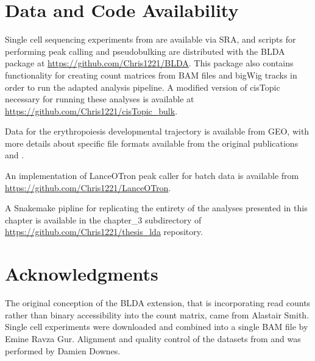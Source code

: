 \section{Data and Code Availability}

Single cell sequencing experiments from \cite{Buenrostro2015} are available via SRA, and scripts for performing peak calling and pseudobulking are distributed with the BLDA package at \url{https://github.com/Chris1221/BLDA}. This package also contains functionality for creating count matrices from BAM files and bigWig tracks in order to run the adapted analysis pipeline. A modified version of cisTopic necessary for running these analyses is available at \url{https://github.com/Chris1221/cisTopic_bulk}. 

Data for the erythropoiesis developmental trajectory is available from GEO, with more details about specific file formats available from the original publications \textcite{Corces2016} and \textcite{Ludwig2019}.

An implementation of LanceOTron peak caller for batch data is available from \url{https://github.com/Chris1221/LanceOTron}.

A Snakemake pipline for replicating the entirety of the analyses presented in this chapter is available in the chapter\_3 subdirectory of \url{https://github.com/Chris1221/thesis_lda} repository.

\section{Acknowledgments}

The original conception of the BLDA extension, that is incorporating read counts rather than binary accessibility into the count matrix, came from Alastair Smith. Single cell experiments were downloaded and combined into a single BAM file by Emine Ravza Gur. Alignment and quality control of the datasets from \textcite{Corces2016} and \textcite{Ludwig2019} was performed by Damien Downes. 